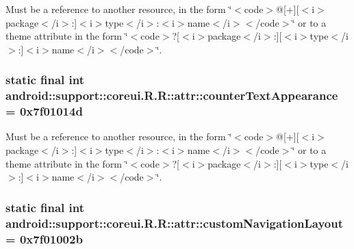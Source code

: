 Must be a reference to another resource, in the form \char`\"{}$<$code$>$@\mbox{[}+\mbox{]}\mbox{[}$<$i$>$package$<$/i$>$:\mbox{]}$<$i$>$type$<$/i$>$:$<$i$>$name$<$/i$>$$<$/code$>$\char`\"{} or to a theme attribute in the form \char`\"{}$<$code$>$?\mbox{[}$<$i$>$package$<$/i$>$:\mbox{]}\mbox{[}$<$i$>$type$<$/i$>$:\mbox{]}$<$i$>$name$<$/i$>$$<$/code$>$\char`\"{}. \hypertarget{classandroid_1_1support_1_1coreui_1_1_r_1_1attr_cf951986f05e57563b3bcd128cd312fb}{
\subsubsection[{counterTextAppearance}]{\setlength{\rightskip}{0pt plus 5cm}static final int android::support::coreui.R.R::attr::counterTextAppearance = 0x7f01014d}}
\label{classandroid_1_1support_1_1coreui_1_1_r_1_1attr_cf951986f05e57563b3bcd128cd312fb}


Must be a reference to another resource, in the form \char`\"{}$<$code$>$@\mbox{[}+\mbox{]}\mbox{[}$<$i$>$package$<$/i$>$:\mbox{]}$<$i$>$type$<$/i$>$:$<$i$>$name$<$/i$>$$<$/code$>$\char`\"{} or to a theme attribute in the form \char`\"{}$<$code$>$?\mbox{[}$<$i$>$package$<$/i$>$:\mbox{]}\mbox{[}$<$i$>$type$<$/i$>$:\mbox{]}$<$i$>$name$<$/i$>$$<$/code$>$\char`\"{}. \hypertarget{classandroid_1_1support_1_1coreui_1_1_r_1_1attr_5548ebaa6d31e5b6dbbdc5329f9c5b2e}{
\subsubsection[{customNavigationLayout}]{\setlength{\rightskip}{0pt plus 5cm}static final int android::support::coreui.R.R::attr::customNavigationLayout = 0x7f01002b}}
\label{classandroid_1_1support_1_1coreui_1_1_r_1_1attr_5548ebaa6d31e5b6dbbdc5329f9c5b2e}


